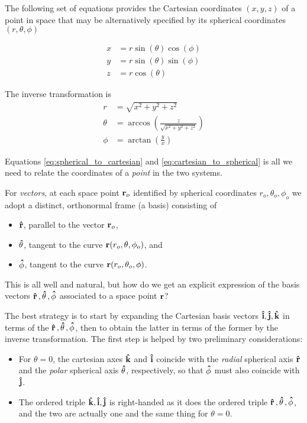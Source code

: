 The following set of equations provides the Cartesian coordinates $(x, y, z)$ of a point in space that may be alternatively specified by its spherical coordinates $(r, \theta, \phi)$ 

\begin{equation}
\label{eq:spherical_to_cartesian}
\begin{aligned}
x &= r \sin (\theta) \cos (\phi) \\
y &= r \sin (\theta) \sin (\phi) \\
z &= r \cos (\theta)
\end{aligned}
\end{equation}

The inverse transformation is 
\begin{equation}
\label{eq:cartesian_to_spherical}
\begin{aligned}
r      &= \sqrt{x^2 + y^2 + z^2} \\
\theta &= \arccos (\frac{z}{\sqrt{x^2 + y^2 + z^2}}) \\
\phi   &= \arctan (\frac{y}{x})
\end{aligned}
\end{equation}

Equations \ref{eq:spherical_to_cartesian} and \ref{eq:cartesian_to_spherical} is all we need to relate the coordinates of a \textit{point} in the two systems.

For \textit{vectors}, at each space point $\vb{r}_o$ identified by spherical coordinates $r_o, \theta_o, \phi_o$ we adopt a distinct, orthonormal frame (a basis) consisting of
\begin{itemize}
\item $\vu{r}$, parallel to the vector $\vb{r}_o$,
\item $\vu{\theta}$, tangent to the curve $\vb{r}(r_o, \theta, \phi_o)$, and 
\item $\vu{\phi}$, tangent to the curve $\vb{r}(r_o, \theta_o, \phi)$.
\end{itemize}

This is all well and natural, but how do we get an explicit expression of the basis vectors $\vu{r}\,, \vu{\theta}\,, \vu{\phi}$ associated to a space point $\vb{r}$?   

The best strategy is to start by expanding the Cartesian basis vectors $\vu{i}, \vu{j}, \vu{k}$ in terms of the $\vu{r}\,, \vu{\theta}\,, \vu{\phi}$, then to obtain the latter in terms of the former by the inverse transformation. The first step is helped by two preliminary considerations:    
\begin{itemize}
\item For $\theta=0$, the cartesian axes $\vu{k}$ and $\vu{i}$ coincide with the \textit{radial} spherical axis $\vu{r}$ and the \textit{polar} spherical axis $\vu{\theta}$, respectively, so that $\vu{\phi}$ must also coincide with $\vu{j}$. 
\item The ordered triple $\vu{k}, \vu{i}, \vu{j}$ is right-handed as it does the ordered triple $\vu{r}\,, \vu{\theta}\,, \vu{\phi}$, and the two are actually one and the same thing for $\theta=0$. 
\end{itemize}

